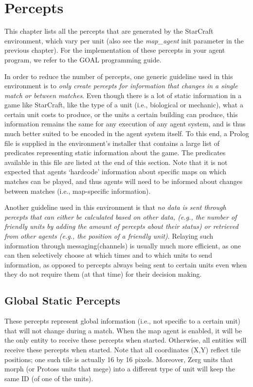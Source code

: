 \chapter{Percepts}

This chapter lists all the percepts that are generated by the StarCraft environment, which vary per unit (also see the \textit{map\_agent} init parameter in the previous chapter). For the implementation of these percepts in your agent program, we refer to the GOAL programming guide.

In order to reduce the number of percepts, one generic guideline used in this environment is to \textit{only create percepts for information that changes in a single match or between matches}. Even though there is a lot of static information in a game like StarCraft, like the type of a unit (i.e., biological or mechanic), what a certain unit costs to produce, or the units a certain building can produce, this information remains the same for any execution of any agent system, and is thus much better suited to be encoded in the agent system itself. To this end, a Prolog file is supplied in the environment's installer that contains a large list of predicates representing static information about the game. The predicates available in this file are listed at the end of this section. Note that it is not expected that agents `hardcode' information about specific maps on which matches can be played, and thus agents will need to be informed about changes between matches (i.e., map-specific information).

Another guideline used in this environment is that \textit{no data is sent through percepts that can either be calculated based on other data, (e.g., the number of friendly units by adding the amount of percepts about their status) or retrieved from other agents (e.g., the position of a friendly unit)}. Relaying such information through messaging(channels) is usually much more efficient, as one can then selectively choose at which times and to which units to send information, as opposed to percepts always being sent to certain units even when they do not require them (at that time) for their decision making.

\section{Global Static Percepts}
These percepts represent global information (i.e., not specific to a certain unit) that will not change during a match. When the map agent is enabled, it will be the only entity to receive these percepts when started. Otherwise, all entities will receive these percepts when started. Note that all coordinates (X,Y) reflect tile positions; one such tile is actually 16 by 16 pixels. Moreover, Zerg units that morph (or Protoss units that mege) into a different type of unit will keep the same ID (of one of the units).

